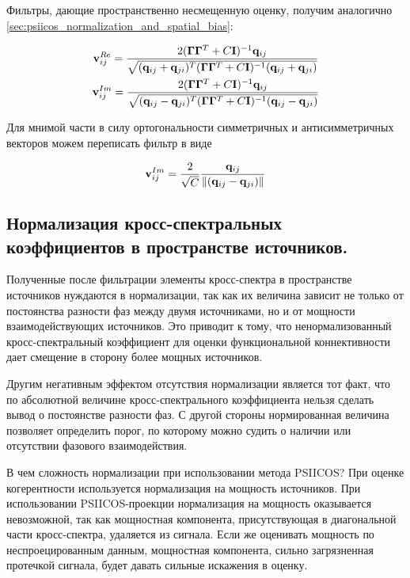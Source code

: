 Фильтры, дающие пространственно несмещенную оценку, получим аналогично \ref{sec:psiicos_normalization_and_spatial_bias}:

\begin{gather}
    \mathbf{v}_{ij}^{Re} = \frac{2(\mathbf{\Gamma}\mathbf{\Gamma}^T + C\mathbf{I})^{-1}\mathbf{q}_{ij}}
    {\sqrt{(\mathbf{q}_{ij} + \mathbf{q}_{ji})^T(\mathbf{\Gamma}\mathbf{\Gamma}^T + C\mathbf{I})^{-1}(\mathbf{q}_{ij} + \mathbf{q}_{ji})}}\\
    \mathbf{v}_{ij}^{Im} = \frac{2(\mathbf{\Gamma}\mathbf{\Gamma}^T + C\mathbf{I})^{-1}\mathbf{q}_{ij}}
    {\sqrt{(\mathbf{q}_{ij} - \mathbf{q}_{ji})^T(\mathbf{\Gamma}\mathbf{\Gamma}^T + C\mathbf{I})^{-1}(\mathbf{q}_{ij} - \mathbf{q}_{ji})}}
\end{gather}

Для мнимой части в силу ортогональности симметричных и антисимметричных векторов можем переписать фильтр в виде

\begin{equation}
    \mathbf{v}_{ij}^{Im} = \frac{2}{\sqrt{C}} \frac{\mathbf{q}_{ij}}{\left\lVert(\mathbf{q}_{ij} - \mathbf{q}_{ji})\right\rVert}
\end{equation}

\subsection{Нормализация кросс-спектральных коэффициентов в пространстве источников.}

Полученные после фильтрации элементы кросс-спектра в пространстве источников нуждаются
в нормализации, так как их величина зависит не только от постоянства разности фаз между
двумя источниками, но и от мощности взаимодействующих источников. Это приводит к тому, что ненормализованный
кросс-спектральный коэффициент для оценки функциональной коннективности дает смещение
в сторону более мощных источников.

Другим негативным эффектом отсутствия нормализации является тот факт, что
по абсолютной величине кросс-спектрального коэффициента нельзя сделать вывод
о постоянстве разности фаз. С другой стороны нормированная величина позволяет
определить порог, по которому можно судить о наличии или отсутствии фазового взаимодействия.

В чем сложность нормализации при использовании метода PSIICOS?\@
При оценке когерентности используется нормализация на мощность источников. При
использовании PSIICOS-проекции нормализация на мощность оказывается
невозможной, так как мощностная компонента, присутствующая в диагональной части
кросс-спектра, удаляется из сигнала. Если же оценивать мощность по неспроецированным
данным, мощностная компонента, сильно загрязненная протечкой сигнала, будет
давать сильные искажения в оценку.

